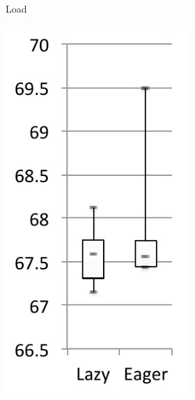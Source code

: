 \documentclass[sigplan,10pt,review,anonymous]{acmart}\settopmatter{printfolios=true,printccs=false,printacmref=false}
\begin{document}
\begin{figure}[bth]
\begin{subfigure}[b]{.48\textwidth}
\begin{subfigure}[b]{.28\textwidth}
		\caption{Load}
   	\end{subfigure}\hspace{.03\textwidth}%
   	\begin{subfigure}[b]{.28\textwidth}
		\includegraphics[width=\linewidth]{figures/netBeansExpExecTime} 

\end{subfigure}
\end{subfigure}
\end{figure}
\end{document}
